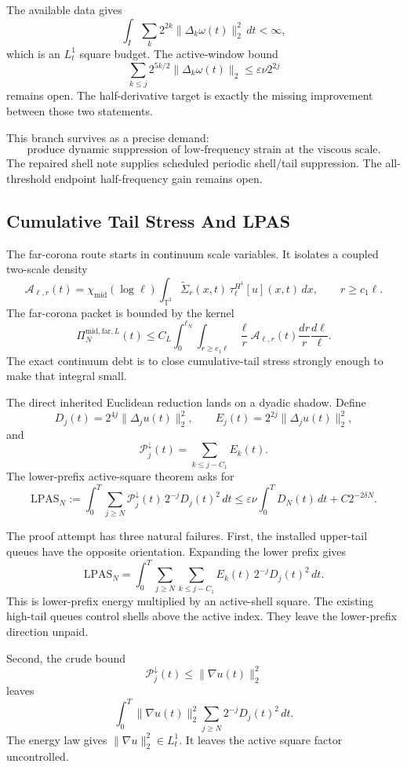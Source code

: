 The available data gives
\[
  \int_I \sum_k2^{2k}\|\Delta_k\omega(t)\|_2^2\,dt<\infty ,
\]
which is an \(L_t^1\) square budget.
The active-window bound
\[
  \sum_{k\le j}2^{5k/2}\|\Delta_k\omega(t)\|_2
  \le
  \varepsilon\nu 2^{2j}
\]
remains open.
The half-derivative target is exactly the missing improvement between those
two statements.

This branch survives as a precise demand:
\[
  \text{produce dynamic suppression of low-frequency strain at the viscous
  scale}.
\]
The repaired shell note supplies scheduled periodic shell/tail suppression.
The all-threshold endpoint half-frequency gain remains open.

\subsection{Cumulative Tail Stress And LPAS}

The far-corona route starts in continuum scale variables.
It isolates a coupled two-scale density
\[
  \mathcal A_{\ell,r}(t)
  =
  \chi_{\mathrm{mid}}(\log\ell)
  \int_{\mathbb T^3}
  \widetilde\Sigma_r(x,t)\,
  \tau_\ell^{H^1}[u](x,t)\,dx,
  \qquad
  r\ge c_1\ell .
\]
The far-corona packet is bounded by the kernel
\[
  \Pi_N^{\mathrm{mid,far},L}(t)
  \le C_L
  \int_0^{\ell_N}\int_{r\ge c_1\ell}
  \frac{\ell}{r}\mathcal A_{\ell,r}(t)
  \frac{dr}{r}\frac{d\ell}{\ell}.
\]
The exact continuum debt is to close cumulative-tail stress strongly enough to
make that integral small.

The direct inherited Euclidean reduction lands on a dyadic shadow.
Define
\[
  D_j(t)=2^{4j}\|\Delta_j u(t)\|_2^2,
  \qquad
  E_j(t)=2^{2j}\|\Delta_j u(t)\|_2^2,
\]
and
\[
  \mathcal P_j^\downarrow(t)
  =
  \sum_{k\le j-C_1}E_k(t).
\]
The lower-prefix active-square theorem asks for
\[
  \mathrm{LPAS}_N
  :=
  \int_0^T\sum_{j\ge N}
  \mathcal P_j^\downarrow(t)\,2^{-j}D_j(t)^2\,dt
  \le
  \varepsilon\nu\int_0^T D_N(t)\,dt+C2^{-2\delta N}.
\]

The proof attempt has three natural failures.
First, the installed upper-tail queues have the opposite orientation.
Expanding the lower prefix gives
\[
  \mathrm{LPAS}_N
  =
  \int_0^T\sum_{j\ge N}\sum_{k\le j-C_1}
  E_k(t)\,2^{-j}D_j(t)^2\,dt .
\]
This is lower-prefix energy multiplied by an active-shell square.
The existing high-tail queues control shells above the active index.
They leave the lower-prefix direction unpaid.

Second, the crude bound
\[
  \mathcal P_j^\downarrow(t)\le\|\nabla u(t)\|_2^2
\]
leaves
\[
  \int_0^T
  \|\nabla u(t)\|_2^2
  \sum_{j\ge N}2^{-j}D_j(t)^2\,dt .
\]
The energy law gives \(\|\nabla u\|_2^2\in L_t^1\).
It leaves the active square factor uncontrolled.

